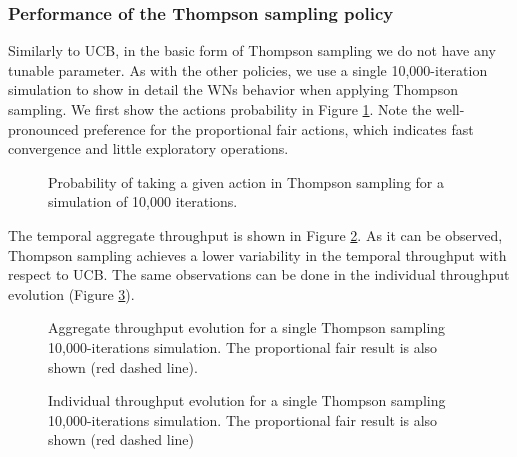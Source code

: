 \documentclass[10pt,journal,compsoc]{IEEEtran}
\begin{document}
	\subsubsection{Performance of the Thompson sampling policy}
	\label{section:ts_study}
	Similarly to UCB, in the basic form of Thompson sampling we do not have any tunable parameter. As with the other policies, we use a single 10,000-iteration simulation to show in detail the WNs behavior when applying Thompson sampling. We first show the actions probability in Figure \ref{fig:actions_probability_ts}. Note the well-pronounced preference for the proportional fair actions, which indicates fast convergence and little exploratory operations.
	\begin{figure}[t!]
		\centering							
		\caption{Probability of taking a given action in Thompson sampling for a simulation of 10,000 iterations.}
		\label{fig:actions_probability_ts}
	\end{figure}		
	
	The temporal aggregate throughput is shown in Figure \ref{fig:ts_tpt_evolution}. As it can be observed, Thompson sampling achieves a lower variability in the temporal throughput with respect to UCB. The same observations can be done in the individual throughput evolution (Figure \ref{fig:ts_ind_tpt_evolution}).
	\begin{figure}[t!]
		\centering							
		\caption{Aggregate throughput evolution for a single Thompson sampling 10,000-iterations simulation. The proportional fair result is also shown (red dashed line).}
		\label{fig:ts_tpt_evolution}
	\end{figure}	
	
	\begin{figure}[t!]
		\centering							
		\caption{Individual throughput evolution for a single Thompson sampling 10,000-iterations simulation. The proportional fair result is also shown (red dashed line)}
		\label{fig:ts_ind_tpt_evolution}
	\end{figure}	
\end{document}
